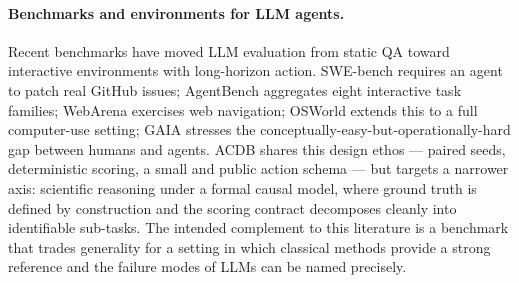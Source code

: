 \paragraph{Benchmarks and environments for LLM agents.} Recent benchmarks have moved LLM evaluation from static QA toward interactive environments with long-horizon action. SWE-bench \citep{jimenez2024swebench} requires an agent to patch real GitHub issues; AgentBench \citep{liu2024agentbench} aggregates eight interactive task families; WebArena \citep{zhou2024webarena} exercises web navigation; OSWorld \citep{xie2024osworld} extends this to a full computer-use setting; GAIA \citep{mialon2023gaia} stresses the conceptually-easy-but-operationally-hard gap between humans and agents. ACDB shares this design ethos --- paired seeds, deterministic scoring, a small and public action schema --- but targets a narrower axis: scientific reasoning under a formal causal model, where ground truth is defined by construction and the scoring contract decomposes cleanly into identifiable sub-tasks. The intended complement to this literature is a benchmark that trades generality for a setting in which classical methods provide a strong reference and the failure modes of LLMs can be named precisely.
